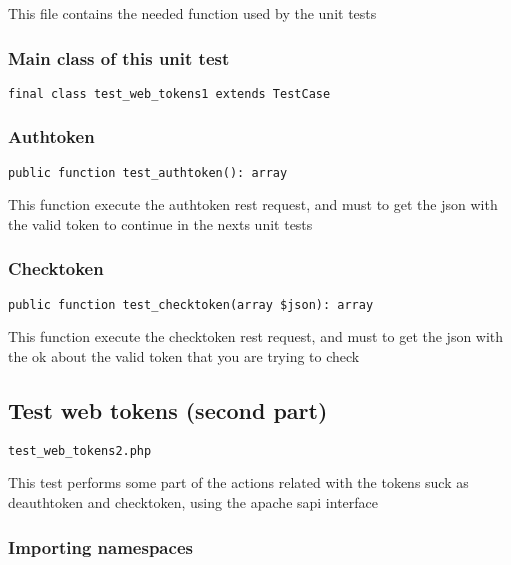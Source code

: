 \documentclass[a4paper]{article}
\begin{document}
This file contains the needed function used by the unit tests

\hypertarget{toc80}{}
\subsubsection{Main class of this unit test}

\begin{lstlisting}
final class test_web_tokens1 extends TestCase
\end{lstlisting}

\hypertarget{toc81}{}
\subsubsection{Authtoken}

\begin{lstlisting}
public function test_authtoken(): array
\end{lstlisting}

This function execute the authtoken rest request, and must to get the
json with the valid token to continue in the nexts unit tests

\hypertarget{toc82}{}
\subsubsection{Checktoken}

\begin{lstlisting}
public function test_checktoken(array $json): array
\end{lstlisting}

This function execute the checktoken rest request, and must to get the
json with the ok about the valid token that you are trying to check

\hypertarget{toc83}{}
\subsection{Test web tokens (second part)}

\begin{lstlisting}
test_web_tokens2.php
\end{lstlisting}

This test performs some part of the actions related with the tokens suck
as deauthtoken and checktoken, using the apache sapi interface

\hypertarget{toc84}{}
\subsubsection{Importing namespaces}
\end{document}

